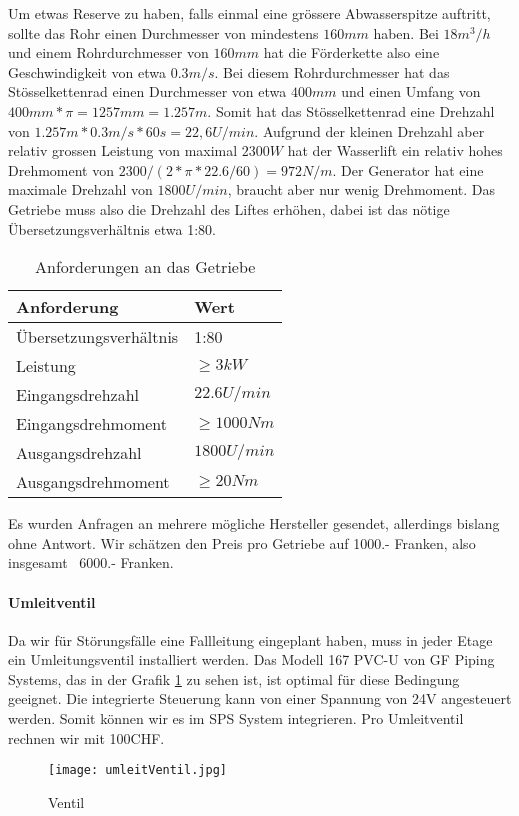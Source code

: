 Um etwas Reserve zu haben, falls einmal eine grössere Abwasserspitze auftritt, sollte das Rohr einen Durchmesser von mindestens \(160mm\) haben. Bei \(18 m^3 /h \) und einem Rohrdurchmesser von \(160mm\) hat die Förderkette also eine Geschwindigkeit von etwa \(0.3 m/s \). Bei diesem Rohrdurchmesser hat das Stösselkettenrad einen Durchmesser von etwa \(400mm\)\cite{schrage} und einen Umfang von \(400mm * \pi = 1257mm = 1.257m\). Somit hat das Stösselkettenrad eine Drehzahl von \(1.257m * 0.3 m/s * 60s = 22,6 U/min\). Aufgrund der kleinen Drehzahl aber relativ grossen Leistung von maximal \(2300 W\) hat der Wasserlift ein relativ hohes Drehmoment von \( 2300 /(2 * \pi * 22.6/ 60) = 972 N/m\). Der Generator hat eine maximale Drehzahl von \(1800 U/min\), braucht aber nur wenig Drehmoment. Das Getriebe muss also die Drehzahl des Liftes erhöhen, dabei ist das nötige Übersetzungsverhältnis etwa 1:80. 
\begin{table}
\small
\begin{center}
\begin{tabular}{ll}
\hline
\textbf{Anforderung}&\textbf{Wert}\\
\hline			
Übersetzungsverhältnis&1:80\\
Leistung&$\geq$\(3 kW\)\\		
Eingangsdrehzahl&\(22.6 U/min\)\\
Eingangsdrehmoment&$\geq$\(1000 Nm\)\\	
Ausgangsdrehzahl&\(1800 U/min\)\\
Ausgangsdrehmoment&$\geq$\(20 Nm\)\\
\hline
\end{tabular}
\caption{Anforderungen an das Getriebe}
\end{center}
\end{table}
Es wurden Anfragen an mehrere mögliche Hersteller gesendet, allerdings bislang ohne Antwort. Wir schätzen den Preis pro Getriebe auf 1000.- Franken, also insgesamt ~6000.- Franken.

\paragraph{Umleitventil}

Da wir für Störungsfälle eine Fallleitung eingeplant haben, muss in jeder Etage ein Umleitungsventil installiert werden. Das Modell 167 PVC-U von GF Piping Systems, das in der Grafik \ref{fig:Umleitungsventil} zu sehen ist, ist optimal für diese Bedingung geeignet. Die integrierte Steuerung kann von einer Spannung von 24V angesteuert werden. Somit können wir es im SPS System integrieren. Pro Umleitventil rechnen wir mit 100CHF.

 \begin{figure} [H]
	\centering
	\texttt{[image: umleitVentil.jpg]}
	\caption{Ventil \cite{GFPipeVentil}}%
	\label{fig:Umleitungsventil}
\end{figure}

